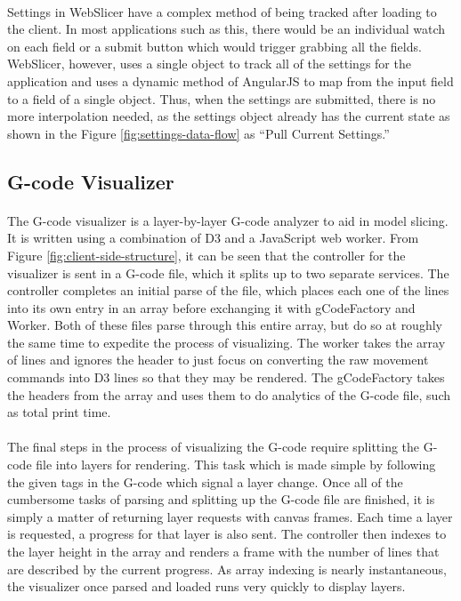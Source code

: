 \paragraph{}
Settings in WebSlicer have a complex method of being tracked after loading to the client.
In most applications such as this, there would be an individual watch on each field or a submit button which would trigger grabbing all the fields.
WebSlicer, however, uses a single object to track all of the settings for the application and uses a dynamic method of AngularJS to map from the input field to a field of a single object.
Thus, when the settings are submitted, there is no more interpolation needed, as the settings object already has the current state as shown in the Figure \ref{fig:settings-data-flow} as ``Pull Current Settings.''

\subsection{G-code Visualizer}
\paragraph{}
The G-code visualizer is a layer-by-layer G-code analyzer to aid in model slicing.
It is written using a combination of D3 and a JavaScript web worker.
From Figure \ref{fig:client-side-structure}, it can be seen that the controller for the visualizer is sent in a G-code file, which it splits up to two separate services.
The controller completes an initial parse of the file, which places each one of the lines into its own entry in an array before exchanging it with gCodeFactory and Worker.
Both of these files parse through this entire array, but do so at roughly the same time to expedite the process of visualizing.
The worker takes the array of lines and ignores the header to just focus on converting the raw movement commands into D3 lines so that they may be rendered.
The gCodeFactory takes the headers from the array and uses them to do analytics of the G-code file, such as total print time.

\paragraph{}
The final steps in the process of visualizing the G-code require splitting the G-code file into layers for rendering.
This task which is made simple by following the given tags in the G-code which signal a layer change.
Once all of the cumbersome tasks of parsing and splitting up the G-code file are finished, it is simply a matter of returning layer requests with canvas frames.
Each time a layer is requested, a progress for that layer is also sent.
The controller then indexes to the layer height in the array and renders a frame with the number of lines that are described by the current progress.
As array indexing is nearly instantaneous, the visualizer once parsed and loaded runs very quickly to display layers.

